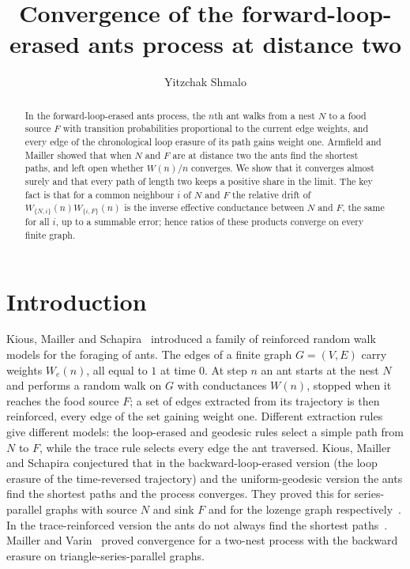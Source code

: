 \documentclass[11pt]{amsart}
\theoremstyle{remark}
\begin{document}
\title[Forward-loop-erased ants at distance two]{Convergence of the forward-loop-erased ants process at distance two}
\author{Yitzchak Shmalo}
\address{Einstein Institute of Mathematics, The Hebrew University of Jerusalem, Jerusalem, Israel}

\begin{abstract}
In the forward-loop-erased ants process, the $n$th ant walks from a nest $N$ to a food source $F$ with transition
probabilities proportional to the current edge weights, and every edge of the chronological loop erasure of its path
gains weight one. Armfield and Mailler showed that when $N$ and $F$ are at distance two the ants find the shortest
paths, and left open whether $W(n)/n$ converges. We show that it converges almost surely and that every path of length
two keeps a positive share in the limit. The key fact is that for a common neighbour $i$ of $N$ and $F$ the relative
drift of $W_{\{N,i\}}(n)W_{\{i,F\}}(n)$ is the inverse effective conductance between $N$ and $F$, the same for all $i$,
up to a summable error; hence ratios of these products converge on every finite graph.
\end{abstract}

\maketitle

\section{Introduction}\label{sec:intro}

Kious, Mailler and Schapira~\cite{KMS22a,KMS22b} introduced a family of reinforced random walk models for the foraging
of ants. The edges of a finite graph $G=(V,E)$ carry weights $W_e(n)$, all equal to $1$ at time $0$. At step $n$ an ant
starts at the nest $N$ and performs a random walk on $G$ with conductances $W(n)$, stopped when it reaches the food
source $F$; a set of edges extracted from its trajectory is then reinforced, every edge of the set gaining weight one.
Different extraction rules give different models: the loop-erased and geodesic rules select a simple path from $N$ to
$F$, while the trace rule selects every edge the ant traversed. Kious, Mailler and Schapira conjectured that in the
backward-loop-erased version (the loop erasure of the time-reversed trajectory) and the uniform-geodesic version the
ants find the shortest paths and the process converges. They proved this for series-parallel graphs with source $N$ and
sink $F$ and for the lozenge graph respectively~\cite{KMS22a}. In the trace-reinforced version the ants do not always
find the shortest paths~\cite{KMS22b}. Mailler and Varin~\cite{MV26} proved convergence
for a two-nest process with the backward erasure on triangle-series-parallel graphs.
\end{document}
